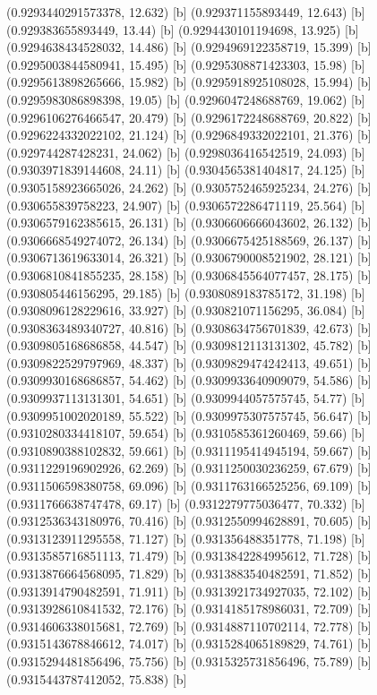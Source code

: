 {{{(0.9293440291573378, 12.632) [b] 
(0.929371155893449, 12.643) [b] 
(0.929383655893449, 13.44) [b] 
(0.9294430101194698, 13.925) [b] 
(0.9294638434528032, 14.486) [b] 
(0.9294969122358719, 15.399) [b] 
(0.9295003844580941, 15.495) [b] 
(0.9295308871423303, 15.98) [b] 
(0.9295613898265666, 15.982) [b] 
(0.9295918925108028, 15.994) [b] 
(0.9295983086898398, 19.05) [b] 
(0.9296047248688769, 19.062) [b] 
(0.9296106276466547, 20.479) [b] 
(0.9296172248688769, 20.822) [b] 
(0.9296224332022102, 21.124) [b] 
(0.9296849332022101, 21.376) [b] 
(0.929744287428231, 24.062) [b] 
(0.9298036416542519, 24.093) [b] 
(0.9303971839144608, 24.11) [b] 
(0.9304565381404817, 24.125) [b] 
(0.9305158923665026, 24.262) [b] 
(0.9305752465925234, 24.276) [b] 
(0.930655839758223, 24.907) [b] 
(0.9306572286471119, 25.564) [b] 
(0.9306579162385615, 26.131) [b] 
(0.9306606666043602, 26.132) [b] 
(0.9306668549274072, 26.134) [b] 
(0.9306675425188569, 26.137) [b] 
(0.9306713619633014, 26.321) [b] 
(0.9306790008521902, 28.121) [b] 
(0.9306810841855235, 28.158) [b] 
(0.9306845564077457, 28.175) [b] 
(0.930805446156295, 29.185) [b] 
(0.9308089183785172, 31.198) [b] 
(0.9308096128229616, 33.927) [b] 
(0.930821071156295, 36.084) [b] 
(0.9308363489340727, 40.816) [b] 
(0.9308634756701839, 42.673) [b] 
(0.9309805168686858, 44.547) [b] 
(0.9309812113131302, 45.782) [b] 
(0.9309822529797969, 48.337) [b] 
(0.9309829474242413, 49.651) [b] 
(0.9309930168686857, 54.462) [b] 
(0.9309933640909079, 54.586) [b] 
(0.9309937113131301, 54.651) [b] 
(0.9309944057575745, 54.77) [b] 
(0.9309951002020189, 55.522) [b] 
(0.9309975307575745, 56.647) [b] 
(0.9310280334418107, 59.654) [b] 
(0.9310585361260469, 59.66) [b] 
(0.9310890388102832, 59.661) [b] 
(0.9311195414945194, 59.667) [b] 
(0.9311229196902926, 62.269) [b] 
(0.9311250030236259, 67.679) [b] 
(0.9311506598380758, 69.096) [b] 
(0.9311763166525256, 69.109) [b] 
(0.9311766638747478, 69.17) [b] 
(0.9312279775036477, 70.332) [b] 
(0.9312536343180976, 70.416) [b] 
(0.9312550994628891, 70.605) [b] 
(0.9313123911295558, 71.127) [b] 
(0.931356488351778, 71.198) [b] 
(0.9313585716851113, 71.479) [b] 
(0.9313842284995612, 71.728) [b] 
(0.9313876664568095, 71.829) [b] 
(0.9313883540482591, 71.852) [b] 
(0.9313914790482591, 71.911) [b] 
(0.9313921734927035, 72.102) [b] 
(0.9313928610841532, 72.176) [b] 
(0.9314185178986031, 72.709) [b] 
(0.9314606338015681, 72.769) [b] 
(0.9314887110702114, 72.778) [b] 
(0.9315143678846612, 74.017) [b] 
(0.9315284065189829, 74.761) [b] 
(0.9315294481856496, 75.756) [b] 
(0.9315325731856496, 75.789) [b] 
(0.9315443787412052, 75.838) [b] 
}}}
